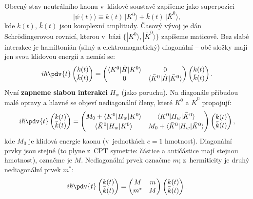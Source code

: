 Obecný stav neutrálního kaonu v~klidové soustavě zapíšeme jako superpozici
\begin{equation}
  |\psi(t)\rangle \equiv k(t)\,|K^0\rangle + \bar k(t)\,|\bar K^0\rangle ,
\end{equation}
kde $k(t)$, $\bar k(t)$ jsou komplexní amplitudy. Časový vývoj je dán Schrödingerovou rovnicí, kterou v~bázi $\{|K^0\rangle,|\bar K^0\rangle\}$ zapíšeme maticově. Bez slabé interakce je hamiltonián (silný a elektromagnetický) diagonální -- obě složky mají jen svou klidovou energii a nemísí se:
\begin{equation}
  i\hbar\pdv{t}\begin{pmatrix} k(t)\\ \bar k(t)\end{pmatrix}
  = \begin{pmatrix} \langle K^0|\hat H|K^0\rangle & 0\\ 0 & \langle\bar K^0|\hat H|\bar K^0\rangle\end{pmatrix}
  \begin{pmatrix} k(t)\\ \bar k(t)\end{pmatrix}.
\end{equation}
Nyní \textbf{zapneme slabou interakci} $H_w$ (jako poruchu). Na diagonále přibudou malé opravy a hlavně se objeví nediagonální členy, které $K^0$ a $\bar K^0$ propojují:
\begin{equation}
  i\hbar\pdv{t}\begin{pmatrix} k(t)\\ \bar k(t)\end{pmatrix}
  = \begin{pmatrix} M_0 + \langle K^0|H_w|K^0\rangle & \langle K^0|H_w|\bar K^0\rangle\\[2pt]
  \langle \bar K^0|H_w|K^0\rangle & M_0 + \langle\bar K^0|H_w|\bar K^0\rangle\end{pmatrix}
  \begin{pmatrix} k(t)\\ \bar k(t)\end{pmatrix},
\end{equation}
kde $M_0$ je klidová energie kaonu (v~jednotkách $c=1$ hmotnost). Diagonální prvky jsou stejné (to plyne z~CPT symetrie: částice a antičástice mají stejnou hmotnost), označme je $M$. Nediagonální prvek označme $m$; z~hermiticity je druhý nediagonální prvek $m^*$:
\begin{equation}
  i\hbar\pdv{t}\begin{pmatrix} k(t)\\ \bar k(t)\end{pmatrix}
  = \begin{pmatrix} M & m\\ m^* & M\end{pmatrix}
  \begin{pmatrix} k(t)\\ \bar k(t)\end{pmatrix}.
\end{equation}
